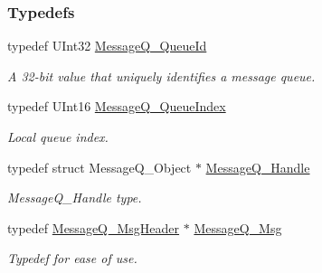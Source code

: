 \subsubsection*{Typedefs}
\begin{DoxyCompactItemize}
\item 
typedef U\-Int32 \hyperlink{_message_q_8h_a34dd32b58cf0476c2d90e3f702843297}{Message\-Q\-\_\-\-Queue\-Id}
\begin{DoxyCompactList}\small\item\em A 32-\/bit value that uniquely identifies a message queue. \end{DoxyCompactList}\item 
typedef U\-Int16 \hyperlink{_message_q_8h_a22a5f41fd82f03f7c14f45dab647bada}{Message\-Q\-\_\-\-Queue\-Index}
\begin{DoxyCompactList}\small\item\em Local queue index. \end{DoxyCompactList}\item 
typedef struct Message\-Q\-\_\-\-Object $\ast$ \hyperlink{_message_q_8h_a1d584ce08733ca864d81e1e64a41cf7a}{Message\-Q\-\_\-\-Handle}
\begin{DoxyCompactList}\small\item\em Message\-Q\-\_\-\-Handle type. \end{DoxyCompactList}\item 
typedef \hyperlink{struct_message_q___msg_header}{Message\-Q\-\_\-\-Msg\-Header} $\ast$ \hyperlink{_message_q_8h_ab675d3cdd0443a1ad05658d375458204}{Message\-Q\-\_\-\-Msg}
\begin{DoxyCompactList}\small\item\em Typedef for ease of use. \end{DoxyCompactList}\end{DoxyCompactItemize}
